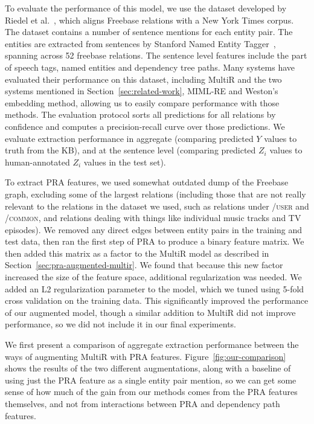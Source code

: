 \documentclass[11pt,a4paper]{article}
\newcommand{\secref}[1]{Section~\ref{sec:#1}}
\newcommand{\figref}[1]{Figure~\ref{fig:#1}}
\newcommand{\relation}[1]{\textsc{#1}}
\begin{document}
To evaluate the performance of this model, we use the dataset developed by
Riedel et al.~, which aligns
Freebase relations with a New York Times corpus.  The dataset contains a number
of sentence mentions for each entity pair. The entities are extracted from
sentences by Stanford Named Entity Tagger~\cite{finkel-2005-non-local-ie},
spanning across 52 freebase relations.  The sentence level features include the
part of speech tags, named entities and dependency tree paths.  Many systems
have evaluated their performance on this dataset, including MultiR and the two
systems mentioned in \secref{related-work}, MIML-RE and Weston's embedding
method, allowing us to easily compare performance with those methods.  The
evaluation protocol sorts all predictions for all relations by confidence and
computes a precision-recall curve over those predictions.  We evaluate
extraction performance in aggregate (comparing predicted $Y$ values to truth
from the KB), and at the sentence level (comparing predicted $Z_i$ values to
human-annotated $Z_i$ values in the test set).

To extract PRA features, we used somewhat outdated dump of the Freebase graph,
excluding some of the largest relations (including those that are not really
relevant to the relations in the dataset we used, such as relations under
\relation{/user} and \relation{/common}, and relations dealing with things like
individual music tracks and TV episodes).  We removed any direct edges between
entity pairs in the training and test data, then ran the first step of PRA to
produce a binary feature matrix.  We then added this matrix as a factor to the
MultiR model as described in \secref{pra-augmented-multir}.  We found that
because this new factor increased the size of the feature space, additional
regularization was needed.  We added an L2 regularization parameter to the
model, which we tuned using 5-fold cross validation on the training data.  This
significantly improved the performance of our augmented model, though a similar
addition to MultiR did not improve performance, so we did not include it in our
final experiments.

We first present a comparison of aggregate extraction performance between the
ways of augmenting MultiR with PRA features.  \figref{our-comparison} shows the
results of the two different augmentations, along with a baseline of using just
the PRA feature as a single entity pair mention, so we can get some sense of
how much of the gain from our methods comes from the PRA features themselves,
and not from interactions between PRA and dependency path features.
\end{document}
